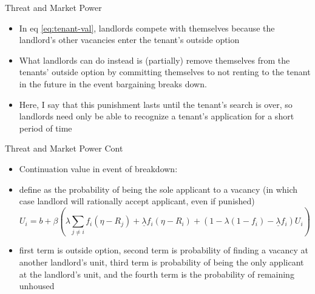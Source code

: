 \documentclass[10pt, xcolor=dvipsnames]{beamer}
\begin{document}
\begin{frame}{Threat and Market Power}
    \begin{itemize}
    \item In eq \ref{eq:tenant-val}, landlords compete with themselves because the landlord's other vacancies enter the tenant's outside option
    \item What landlords can do instead is (partially) remove themselves from the tenants' outside option by committing themselves to not renting to the tenant in the future in the event bargaining breaks down.
    \item Here, I say that this punishment lasts until the tenant's search is over, so landlords need only be able to recognize a tenant's application for a short period of time
    \end{itemize}
\end{frame}

\begin{frame}{Threat and Market Power Cont}
    \begin{itemize}
         \item Continuation value in event of breakdown:
        \item define \boldsymbol{$\underline{\lambda}$} as the probability of being the sole applicant to a vacancy (in which case landlord will rationally accept applicant, even if punished)
        \begin{equation}\label{eq:match-val}
            U_i = b + \beta \left(\lambda\sum_{j\neq i}f_i(\eta - R_j) + \underline{\lambda} f_i(\eta - R_i) + (1-\lambda(1-f_i) - \underline{\lambda} f_i)U_i\right)
        \end{equation}
        \item first term is outside option, second term is probability of finding a vacancy at another landlord's unit, third term is probability of being the only applicant at the landlord's unit, and the fourth term is the probability of remaining unhoused
    \end{itemize}
\end{frame}
\end{document}
